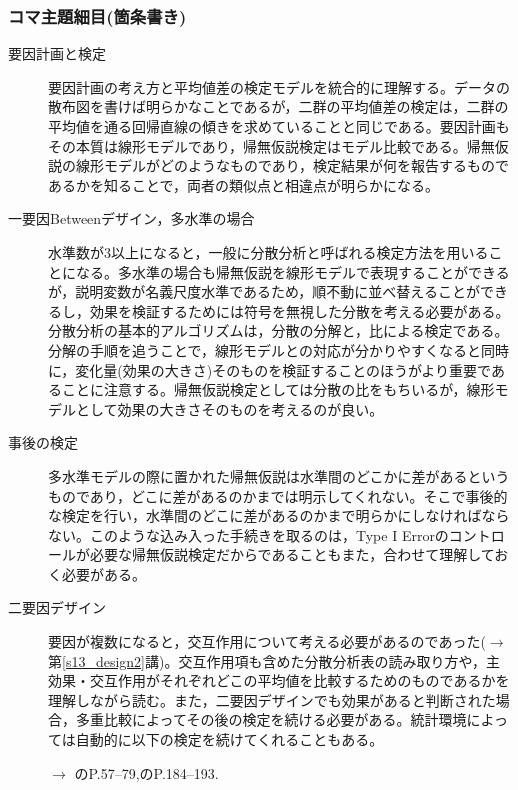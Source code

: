 \subsubsection{コマ主題細目(箇条書き)}
\begin{description}

	\item[要因計画と検定]要因計画の考え方と平均値差の検定モデルを統合的に理解する。データの散布図を書けば明らかなことであるが，二群の平均値差の検定は，二群の平均値を通る回帰直線の傾きを求めていることと同じである。要因計画もその本質は線形モデルであり，帰無仮説検定はモデル比較である。帰無仮説の線形モデルがどのようなものであり，検定結果が何を報告するものであるかを知ることで，両者の類似点と相違点が明らかになる。

	\item[一要因Betweenデザイン，多水準の場合]水準数が3以上になると，一般に分散分析と呼ばれる検定方法を用いることになる。多水準の場合も帰無仮説を線形モデルで表現することができるが，説明変数が名義尺度水準であるため，順不動に並べ替えることができるし，効果を検証するためには符号を無視した分散を考える必要がある。分散分析の基本的アルゴリズムは，分散の分解と，比による検定である。分解の手順を追うことで，線形モデルとの対応が分かりやすくなると同時に，変化量(効果の大きさ)そのものを検証することのほうがより重要であることに注意する。帰無仮説検定としては分散の比をもちいるが，線形モデルとして効果の大きさそのものを考えるのが良い。

	\item[事後の検定]多水準モデルの際に置かれた帰無仮説は水準間のどこかに差があるというものであり，どこに差があるのかまでは明示してくれない。そこで事後的な検定を行い，水準間のどこに差があるのかまで明らかにしなければならない。このような込み入った手続きを取るのは，Type I Errorのコントロールが必要な帰無仮説検定だからであることもまた，合わせて理解しておく必要がある。


	\item[二要因デザイン]要因が複数になると，交互作用について考える必要があるのであった($\to$第\ref{s13_design2}講)。交互作用項も含めた分散分析表の読み取り方や，主効果・交互作用がそれぞれどこの平均値を比較するためのものであるかを理解しながら読む。また，二要因デザインでも効果があると判断された場合，多重比較によってその後の検定を続ける必要がある。統計環境によっては自動的に以下の検定を続けてくれることもある。
	      \begin{flushright}
		      $\to$ \citet{Hashimoto201607} のP.57--79,\citet{Yamada2004}のP.184--193.
	      \end{flushright}

\end{description}
